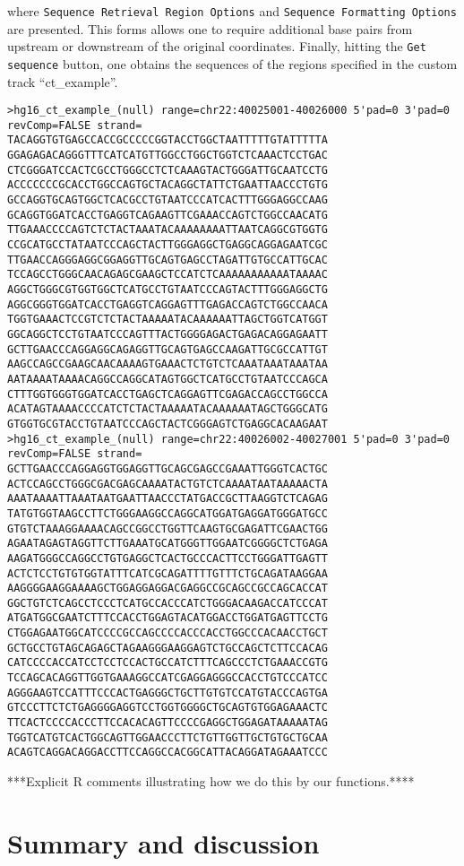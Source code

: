 \documentclass[notitlepage,11pt]{article}
\begin{document}
\begin{itemize}
\noindent where \texttt{Sequence Retrieval Region Options} and 
\texttt{Sequence Formatting Options} are presented. This forms allows one to require additional base pairs from upstream or 
downstream of the original coordinates. Finally, hitting the \texttt{Get sequence} button, one obtains 
the sequences of the  regions specified in the custom track ``ct\_example''. 
\scriptsize
\begin{verbatim}
>hg16_ct_example_(null) range=chr22:40025001-40026000 5'pad=0 3'pad=0 revComp=FALSE strand=
TACAGGTGTGAGCCACCGCCCCCGGTACCTGGCTAATTTTTGTATTTTTA
GGAGAGACAGGGTTTCATCATGTTGGCCTGGCTGGTCTCAAACTCCTGAC
CTCGGGATCCACTCGCCTGGGCCTCTCAAAGTACTGGGATTGCAATCCTG
ACCCCCCCGCACCTGGCCAGTGCTACAGGCTATTCTGAATTAACCCTGTG
GCCAGGTGCAGTGGCTCACGCCTGTAATCCCATCACTTTGGGAGGCCAAG
GCAGGTGGATCACCTGAGGTCAGAAGTTCGAAACCAGTCTGGCCAACATG
TTGAAACCCCAGTCTCTACTAAATACAAAAAAAATTAATCAGGCGTGGTG
CCGCATGCCTATAATCCCAGCTACTTGGGAGGCTGAGGCAGGAGAATCGC
TTGAACCAGGGAGGCGGAGGTTGCAGTGAGCCTAGATTGTGCCATTGCAC
TCCAGCCTGGGCAACAGAGCGAAGCTCCATCTCAAAAAAAAAAATAAAAC
AGGCTGGGCGTGGTGGCTCATGCCTGTAATCCCAGTACTTTGGGAGGCTG
AGGCGGGTGGATCACCTGAGGTCAGGAGTTTGAGACCAGTCTGGCCAACA
TGGTGAAACTCCGTCTCTACTAAAAATACAAAAAATTAGCTGGTCATGGT
GGCAGGCTCCTGTAATCCCAGTTTACTGGGGAGACTGAGACAGGAGAATT
GCTTGAACCCAGGAGGCAGAGGTTGCAGTGAGCCAAGATTGCGCCATTGT
AAGCCAGCCGAAGCAACAAAAGTGAAACTCTGTCTCAAATAAATAAATAA
AATAAAATAAAACAGGCCAGGCATAGTGGCTCATGCCTGTAATCCCAGCA
CTTTGGTGGGTGGATCACCTGAGCTCAGGAGTTCGAGACCAGCCTGGCCA
ACATAGTAAAACCCCATCTCTACTAAAAATACAAAAAATAGCTGGGCATG
GTGGTGCGTACCTGTAATCCCAGCTACTCGGGAGTCTGAGGCACAAGAAT
>hg16_ct_example_(null) range=chr22:40026002-40027001 5'pad=0 3'pad=0 revComp=FALSE strand=
GCTTGAACCCAGGAGGTGGAGGTTGCAGCGAGCCGAAATTGGGTCACTGC
ACTCCAGCCTGGGCGACGAGCAAAATACTGTCTCAAAATAATAAAAACTA
AAATAAAATTAAATAATGAATTAACCCTATGACCGCTTAAGGTCTCAGAG
TATGTGGTAAGCCTTCTGGGAAGGCCAGGCATGGATGAGGATGGGATGCC
GTGTCTAAAGGAAAACAGCCGGCCTGGTTCAAGTGCGAGATTCGAACTGG
AGAATAGAGTAGGTTCTTGAAATGCATGGGTTGGAATCGGGGCTCTGAGA
AAGATGGGCCAGGCCTGTGAGGCTCACTGCCCACTTCCTGGGATTGAGTT
ACTCTCCTGTGTGGTATTTCATCGCAGATTTTGTTTCTGCAGATAAGGAA
AAGGGGAAGGAAAAGCTGGAGGAGGACGAGGCCGCAGCCGCCAGCACCAT
GGCTGTCTCAGCCTCCCTCATGCCACCCATCTGGGACAAGACCATCCCAT
ATGATGGCGAATCTTTCCACCTGGAGTACATGGACCTGGATGAGTTCCTG
CTGGAGAATGGCATCCCCGCCAGCCCCACCCACCTGGCCCACAACCTGCT
GCTGCCTGTAGCAGAGCTAGAAGGGAAGGAGTCTGCCAGCTCTTCCACAG
CATCCCCACCATCCTCCTCCACTGCCATCTTTCAGCCCTCTGAAACCGTG
TCCAGCACAGGTTGGTGAAAGGCCATCGAGGAGGGCCACCTGTCCCATCC
AGGGAAGTCCATTTCCCACTGAGGGCTGCTTGTGTCCATGTACCCAGTGA
GTCCCTTCTCTGAGGGGAGGTCCTGGTGGGGCTGCAGTGTGGAGAAACTC
TTCACTCCCCACCCTTCCACACAGTTCCCCGAGGCTGGAGATAAAAATAG
TGGTCATGTCACTGGCAGTTGGAACCCTTCTGTTGGTTGCTGTGCTGCAA
ACAGTCAGGACAGGACCTTCCAGGCCACGGCATTACAGGATAGAAATCCC
\end{verbatim}
\normalsize


\end{itemize}

***Explicit R comments illustrating how we do this by our functions.****

\section{Summary and discussion}




\end{document}
